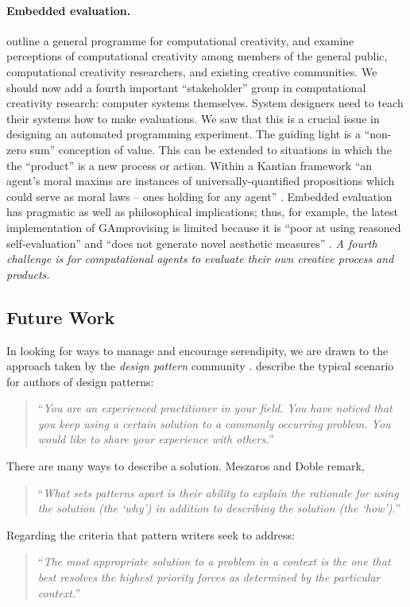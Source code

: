 \paragraph{\textbf{Embedded evaluation}.}   outline a general programme
  for computational creativity, and examine perceptions of
  computational creativity among members of the general public,
  computational creativity researchers, and existing creative
  communities.  We should now add a fourth important ``stakeholder''
  group in computational creativity research: computer systems
  themselves.  System designers need to teach their systems how to
  make evaluations.  We saw that this is a crucial issue in designing
  an automated programming experiment.  The guiding light is a
  ``non-zero sum'' conception of value.  This can be extended to
  situations in which the the ``product'' is a new process or action.
  Within a Kantian framework ``an agent's moral maxims are instances
  of universally-quantified propositions which could serve as moral
  laws -- ones holding for any agent'' \cite{powers2005deontological}.
  Embedded evaluation has pragmatic as well as philosophical
  implications; thus, for example, the latest implementation of {\sf
    GAmprovising} is limited because it is ``poor at using reasoned
  self-evaluation'' and ``does not generate novel aesthetic measures''
  \cite[pp.~189, 288]{jordanous2012evaluating}.  \emph{A fourth
    challenge is for computational agents to evaluate their own
    creative process and products.}

\subsection{Future Work} \label{sec:futurework} \label{sec:hatching}

In looking for ways to manage and encourage serendipity, we are drawn
to the approach taken by the \emph{design pattern} community
\cite{alexander1999origins}. 
 describe the typical scenario for authors of design patterns:

\begin{quote}
\noindent ``\emph{You are an experienced practitioner in your field.  You
have noticed that you keep using a certain solution to a commonly
occurring problem.  You would like to share your experience with
others.}''
\end{quote}

\noindent There are many ways to describe a solution. Meszaros and Doble remark,
\begin{quote}
\noindent ``\emph{What sets patterns apart is their ability to explain the
rationale for using the solution (the `why') in addition to describing
the solution (the `how').}''
\end{quote}
Regarding the criteria that pattern writers seek to address: 
\begin{quote}
\noindent ``\emph{The most appropriate solution to a problem in a context is
the one that best resolves the highest priority forces as determined
by the particular context.}''
\end{quote}

